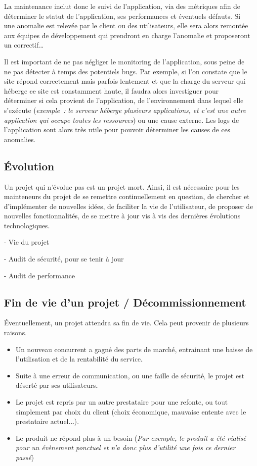 La maintenance inclut donc le suivi de l'application, via des métriques afin de déterminer le statut de l'application, ses performances et éventuels défauts. Si une anomalie est relevée par le client ou des utilisateurs, elle sera alors remontée aux équipes de développement qui prendront en charge l'anomalie et proposeront un correctif\ldots

Il est important de ne pas négliger le monitoring de l'application, sous peine de ne pas détecter à temps des potentiels bugs. Par exemple, si l'on constate que le site répond correctement mais parfois lentement et que la charge du serveur qui héberge ce site est constamment haute, il faudra alors investiguer pour déterminer si cela provient de l'application, de l'environnement dans lequel elle s'exécute (\emph{exemple : le serveur héberge plusieurs applications, et c'est une autre application qui occupe toutes les ressources}) ou une cause externe. Les logs de l'application sont alors très utile pour pouvoir déterminer les causes de ces anomalies.

\subsection{Évolution}

Un projet qui n'évolue pas est un projet mort. Ainsi, il est nécessaire pour les mainteneurs du projet de se remettre continuellement en question, de chercher et d'implémenter de nouvelles idées, de faciliter la vie de l'utilisateur, de proposer de nouvelles fonctionnalités, de se mettre à jour vis à vis des dernières évolutions technologiques.


- Vie du projet

- Audit de sécurité, pour se tenir à jour

- Audit de performance

\subsection{Fin de vie d'un projet / Décommissionnement}


Éventuellement, un projet attendra sa fin de vie. Cela peut provenir de plusieurs raisons.

\begin{itemize}
	\setlength\itemsep{-0.5em}
	\item Un nouveau concurrent a gagné des parts de marché, entrainant une baisse de l'utilisation et de la rentabilité du service.
	\item Suite à une erreur de communication, ou une faille de sécurité, le projet est déserté par ses utilisateurs.
	\item Le projet est repris par un autre prestataire pour une refonte, ou tout simplement par choix du client (choix économique, mauvaise entente avec le prestataire actuel...).
	\item Le produit ne répond plus à un besoin (\emph{Par exemple, le produit a été réalisé pour un évènement ponctuel et n'a donc plus d'utilité une fois ce dernier passé})
\end{itemize}

